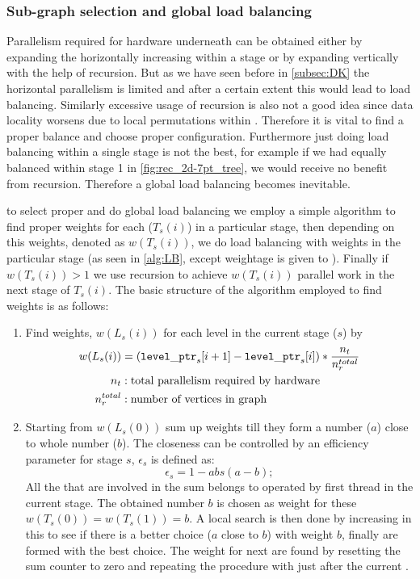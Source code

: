 \subsubsection{Sub-graph selection and global load balancing} \label{subsec:subgraph_selection}
Parallelism required for hardware underneath can be obtained either by expanding the \levelTree horizontally \ie increasing \levelGroups within a stage or by expanding \levelTree vertically with the help of recursion. But as we have seen before in \cref{subsec:DK} the horizontal parallelism is limited and after a certain extent this would lead to load balancing. Similarly excessive usage of recursion is also not a good idea since data locality worsens due to local permutations within \subgraph. Therefore it is vital to find a proper balance and choose proper configuration. Furthermore just doing load balancing within a single stage is not the best, for example if we had equally balanced within stage 1 in \cref{fig:rec_2d-7pt_tree}, we would receive no benefit from recursion. Therefore a global load balancing becomes inevitable.

\Inorder to select proper \subgraph and do global load balancing we employ a simple algorithm to find proper weights for each \levelGroup ($T_s(i)$) in a particular stage, then depending on this weights, denoted as $w(T_s(i))$, we do load balancing with weights in the particular stage (as seen in \cref{alg:LB}, except weightage is given to \levelGroups). Finally if $w(T_s(i)) > 1$ we use recursion to achieve $w(T_s(i))$ parallel work in the next stage of $T_s(i)$. The basic structure of the algorithm employed to find weights is as follows:
\begin{enumerate}
	\item Find weights, $w(L_s(i))$ for each level in the current stage ($s$) by
		\begin{align*}
			w(L_s(i)) &= ({\tt level\_ptr}_s[i+1] - {\tt level\_ptr}_s[i])*\frac{n_{t}}{n_{r}^{total}}\\
			n_{t} &: \text{total parallelism required by hardware}\\
			n_{r}^{total} &: \text{number of vertices in graph}
		\end{align*}
	
	\item Starting from $w(L_s(0))$ sum up weights till they form a number ($a$) close to whole number ($b$). The closeness can be controlled by an efficiency parameter for stage $s$, $\epsilon_s$ is defined as:
	\begin{equation} \label{eq:epsilon}
		\epsilon_s =  1 - abs(a-b);
	\end{equation}
	All the \levels that are involved in the sum belongs to \levelGroups  operated by first thread in the current stage. The obtained number $b$ is chosen as weight for these \levelGroups \ie $w(T_s(0))=w(T_s(1))=b$. A local search is then done by increasing \levels in this \levelGroups to see if there is a better choice ($a$ close to $b$) with weight $b$, finally \levelGroups are formed with the best choice.  The weight for next \levelGroups are found by resetting the sum counter to zero and repeating the  procedure with \levels just after the current \levelGroups.
\end{enumerate}
